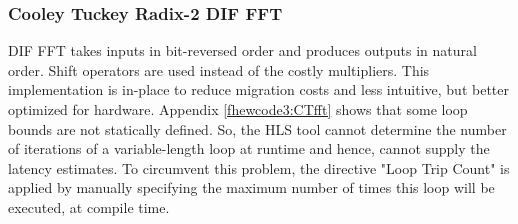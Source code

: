 
\subsubsection{Cooley Tuckey Radix-2 DIF FFT}
DIF FFT takes inputs in bit-reversed order and produces outputs in natural order. Shift operators are used instead of the costly multipliers. This implementation is in-place to reduce migration costs and less intuitive, but better optimized for hardware. \newline\newline
Appendix \ref{fhewcode3:CTfft} shows that some loop bounds are not statically defined. So, the HLS tool cannot determine the number of iterations of a variable-length loop at runtime and hence, cannot supply the latency estimates. To circumvent this problem, the directive "Loop Trip Count" is applied by manually specifying the maximum number of times this loop will be executed, at compile time.\newline\newline

